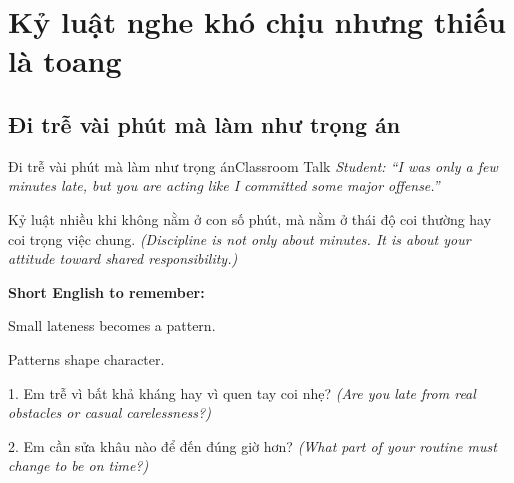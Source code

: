 \chapter{Kỷ luật nghe khó chịu nhưng thiếu là toang}

\section{Đi trễ vài phút mà làm như trọng án}
\begin{truyen}{Đi trễ vài phút mà làm như trọng án}{Classroom Talk}
\textit{Student: ``I was only a few minutes late, but you are acting like I committed some major offense.''}\\[4pt]



\end{truyen}

\begin{baihoc}
Kỷ luật nhiều khi không nằm ở con số phút, mà nằm ở thái độ coi thường hay coi trọng việc chung.
\textit{(Discipline is not only about minutes. It is about your attitude toward shared responsibility.)}
\end{baihoc}

\begin{ghinhoanh}
\textbf{Short English to remember:}

Small lateness becomes a pattern.

Patterns shape character.
\end{ghinhoanh}

\begin{tuhocnhanh}
1. Em trễ vì bất khả kháng hay vì quen tay coi nhẹ? \textit{(Are you late from real obstacles or casual carelessness?)}

2. Em cần sửa khâu nào để đến đúng giờ hơn? \textit{(What part of your routine must change to be on time?)}
\end{tuhocnhanh}
\ngancach

